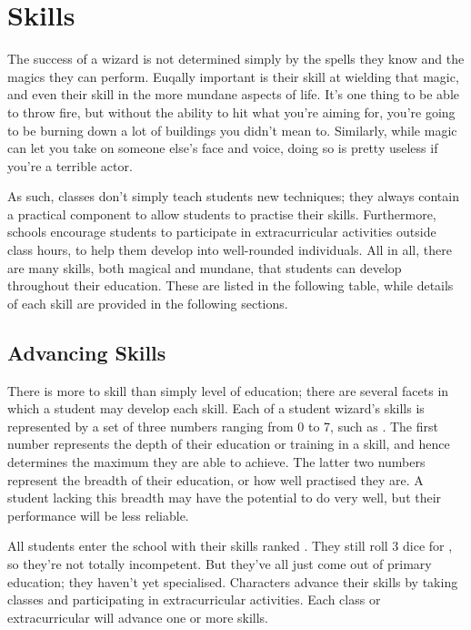 \chapter{Skills}

The success of a wizard is not determined simply by the spells they know and the magics they can perform.
Euqally important is their skill at wielding that magic, and even their skill in the more mundane aspects of life.
It's one thing to be able to throw fire, but without the ability to hit what you're aiming for, you're going to be burning down a lot of buildings you didn't mean to.
Similarly, while magic can let you take on someone else's face and voice, doing so is pretty useless if you're a terrible actor.

As such, classes don't simply teach students new techniques; they always contain a practical component to allow students to practise their skills.
Furthermore, schools encourage students to participate in extracurricular activities outside class hours, to help them develop into well-rounded individuals.
All in all, there are many skills, both magical and mundane, that students can develop throughout their education.
These are listed in the following table, while details of each skill are provided in the following sections.


\section{Advancing Skills}

There is more to skill than simply level of education; there are several facets in which a student may develop each skill.
Each of a student wizard's skills is represented by a set of three numbers ranging from 0 to 7, such as .
The first number represents the depth of their education or training in a skill, and hence determines the maximum they are able to achieve.
The latter two numbers represent the breadth of their education, or how well practised they are.
A student lacking this breadth may have the potential to do very well, but their performance will be less reliable.

All students enter the school with their skills ranked .
They still roll 3 dice for {\tests}, so they're not totally incompetent.
But they've all just come out of primary education; they haven't yet specialised.
Characters advance their skills by taking classes and participating in extracurricular activities.
Each class or extracurricular will advance one or more skills.

